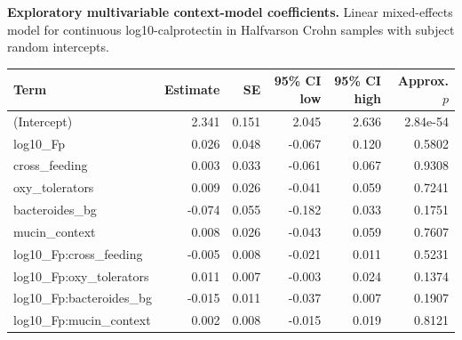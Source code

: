 \noindent\textbf{Exploratory multivariable context-model coefficients.} Linear mixed-effects model for continuous log10-calprotectin in Halfvarson Crohn samples with subject random intercepts.

\begin{center}
\scriptsize
\begin{tabularx}{\textwidth}{@{} l r r r r r @{}}
\toprule
Term & Estimate & SE & 95\% CI low & 95\% CI high & Approx. \(p\) \\
\midrule
(Intercept) & 2.341 & 0.151 & 2.045 & 2.636 & 2.84e-54 \\
log10\_Fp & 0.026 & 0.048 & -0.067 & 0.120 & 0.5802 \\
cross\_feeding & 0.003 & 0.033 & -0.061 & 0.067 & 0.9308 \\
oxy\_tolerators & 0.009 & 0.026 & -0.041 & 0.059 & 0.7241 \\
bacteroides\_bg & -0.074 & 0.055 & -0.182 & 0.033 & 0.1751 \\
mucin\_context & 0.008 & 0.026 & -0.043 & 0.059 & 0.7607 \\
log10\_Fp:cross\_feeding & -0.005 & 0.008 & -0.021 & 0.011 & 0.5231 \\
log10\_Fp:oxy\_tolerators & 0.011 & 0.007 & -0.003 & 0.024 & 0.1374 \\
log10\_Fp:bacteroides\_bg & -0.015 & 0.011 & -0.037 & 0.007 & 0.1907 \\
log10\_Fp:mucin\_context & 0.002 & 0.008 & -0.015 & 0.019 & 0.8121 \\
\bottomrule
\end{tabularx}
\end{center}

